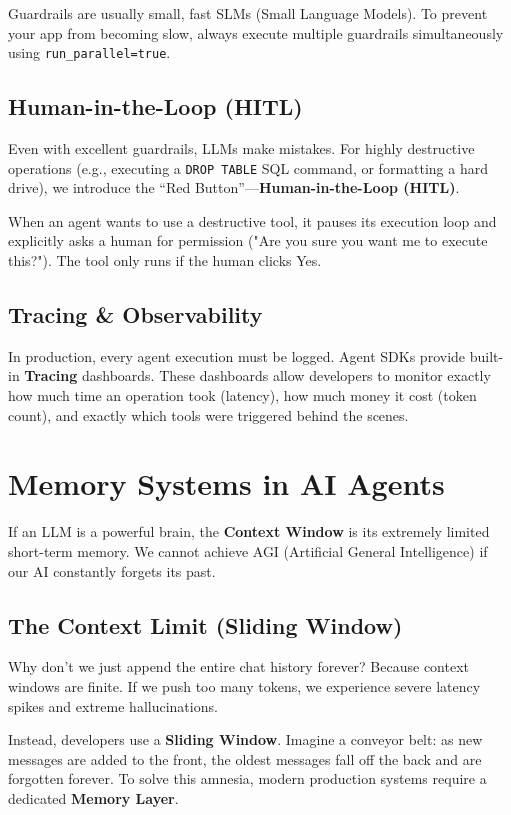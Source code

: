 \documentclass[12pt,a4paper,oneside]{book}
\begin{document}
\begin{tipbox}
	Guardrails are usually small, fast SLMs (Small Language Models). To prevent your app from becoming slow, always execute multiple guardrails simultaneously using \texttt{run\_parallel=true}.
\end{tipbox}

\section{Human-in-the-Loop (HITL)}
Even with excellent guardrails, LLMs make mistakes. For highly destructive operations (e.g., executing a \texttt{DROP TABLE} SQL command, or formatting a hard drive), we introduce the ``Red Button''---\textbf{Human-in-the-Loop (HITL)}.

When an agent wants to use a destructive tool, it pauses its execution loop and explicitly asks a human for permission ("Are you sure you want me to execute this?"). The tool only runs if the human clicks Yes.

\section{Tracing \& Observability}
In production, every agent execution must be logged. Agent SDKs provide built-in \textbf{Tracing} dashboards. These dashboards allow developers to monitor exactly how much time an operation took (latency), how much money it cost (token count), and exactly which tools were triggered behind the scenes.
\chapter{Memory Systems in AI Agents}

If an LLM is a powerful brain, the \textbf{Context Window} is its extremely limited short-term memory. We cannot achieve AGI (Artificial General Intelligence) if our AI constantly forgets its past.

\section{The Context Limit (Sliding Window)}
Why don't we just append the entire chat history forever? Because context windows are finite. If we push too many tokens, we experience severe latency spikes and extreme hallucinations.

Instead, developers use a \textbf{Sliding Window}. Imagine a conveyor belt: as new messages are added to the front, the oldest messages fall off the back and are forgotten forever. To solve this amnesia, modern production systems require a dedicated \textbf{Memory Layer}.
\end{document}
